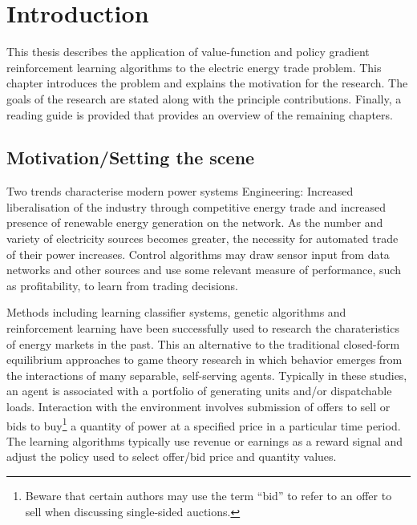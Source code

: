 \chapter{Introduction}
This thesis describes the application of value-function and policy gradient
reinforcement learning algorithms to the electric energy trade problem.  This
chapter introduces the problem and explains the motivation for the research.
The goals of the research are stated along with the principle contributions.
Finally, a reading guide is provided that provides an overview of the remaining
chapters.

\section{Motivation/Setting the scene}
Two trends characterise modern power systems Engineering:
Increased liberalisation of the industry through competitive energy trade and
increased presence of renewable energy generation on the network.  As the
number and variety of electricity sources becomes greater, the necessity for
automated trade of their power increases.  Control algorithms may draw sensor
input from data networks and other sources and use some relevant measure of
performance, such as profitability, to learn from trading decisions.

Methods including learning classifier systems, genetic algorithms and
reinforcement learning have been successfully used to research the
charateristics of energy markets in the past\cite{anke:2008}.  This an
alternative to the traditional closed-form equilibrium approaches to game
theory research in which behavior emerges from the interactions of many
separable, self-serving agents. Typically in these studies, an agent is
associated with a portfolio of generating units and/or dispatchable
loads. Interaction with the environment involves submission of offers to sell
or bids to buy\footnote{Beware that certain authors may use the term ``bid''
to refer to an offer to sell when discussing single-sided auctions.} a
quantity of power at a specified price in a particular time period.  The
learning algorithms typically use revenue or earnings as a reward signal and
adjust the policy used to select offer/bid price and quantity values.

